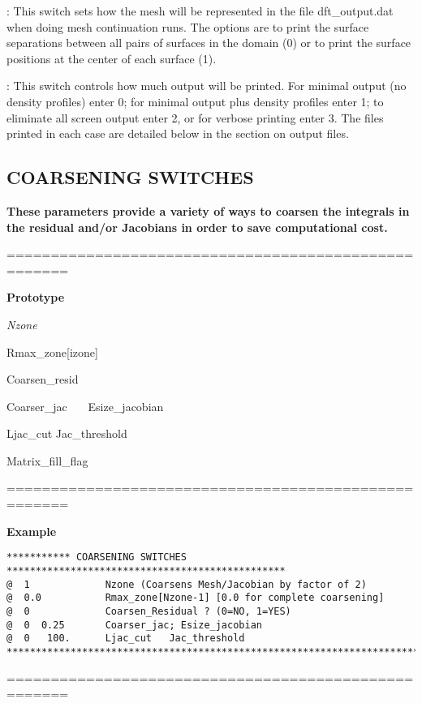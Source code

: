 \documentclass[10pt,onecolumn]{article}
\begin{document}
\vspace{0.1in}
: This switch sets how the mesh will be represented in the
file dft\_output.dat when doing mesh continuation runs.  The options are to print the surface separations
between all pairs of surfaces in the domain (0) or to print the surface
positions at the center of each surface (1).

\vspace{0.1in}
:  This switch controls how much output will be
printed. For minimal output (no density profiles) enter 0; for minimal
output plus density profiles enter 1; to eliminate all screen output enter 2,
or for verbose printing enter 3.
The files printed in each case are detailed below in the section on output files.

\vfill
\break

\subsection{COARSENING SWITCHES}
{\bf  These parameters provide a
variety of ways to coarsen the integrals in the residual and/or
Jacobians in order to save computational cost. }

\noindent=====================================================

{\bf Prototype}

{\it Nzone

Rmax\_zone[izone]

Coarsen\_resid

Coarser\_jac \ \ \ Esize\_jacobian

Ljac\_cut  Jac\_threshold

Matrix\_fill\_flag
}

\noindent=====================================================

{\bf Example}

\begin{verbatim}
*********** COARSENING SWITCHES ************************************************
@  1             Nzone (Coarsens Mesh/Jacobian by factor of 2)
@  0.0           Rmax_zone[Nzone-1] [0.0 for complete coarsening]
@  0             Coarsen_Residual ? (0=NO, 1=YES)
@  0  0.25       Coarser_jac; Esize_jacobian
@  0   100.      Ljac_cut   Jac_threshold
***********************************************************************
\end{verbatim}

\noindent=====================================================
\vspace{0.1in}
\end{document}

